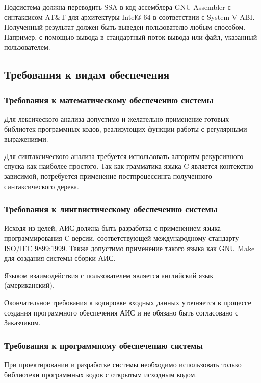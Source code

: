 \documentclass[14pt,russian]{extarticle}
\begin{document}
Подсистема должна переводить SSA в код ассемблера GNU Assembler с синтаксисом
AT\&T для архитектуры Intel® 64 в соответствии с System V ABI. Полученный
результат должен быть выведен пользователю любым способом. Например, с помощью
вывода в стандартный поток вывода или файл, указанный пользователем.

\subsection{Требования к видам обеспечения}

\subsubsection{Требования к математическому обеспечению системы}

Для лексического анализа допустимо и желательно применение готовых библиотек
программных кодов, реализующих функции работы с регулярными выражениями.

Для синтаксического анализа требуется использовать алгоритм рекурсивного спуска
как наиболее простого. Так как грамматика языка C является контекстно-зависимой,
потребуется применение постпроцессинга полученного синтаксического дерева.

\subsubsection{Требования к лингвистическому обеспечению системы}

Исходя из целей, АИС должна быть разработка с применением языка программирования
C версии, соответствующей международному стандарту ISO/IEC 9899:1999. Также
допустимо применение такого языка как GNU Make для создания системы сборки АИС.

Языком взаимодействия с пользователем является английский язык (американский).

Окончательное требования к кодировке входных данных уточняется в процессе
создания программного обеспечения АИС и не обязано быть согласовано с
Заказчиком.

\subsubsection{Требования к программному обеспечению системы}

При проектировании и разработке системы необходимо использовать только
библиотеки программных кодов с открытым исходным кодом.
\end{document}
